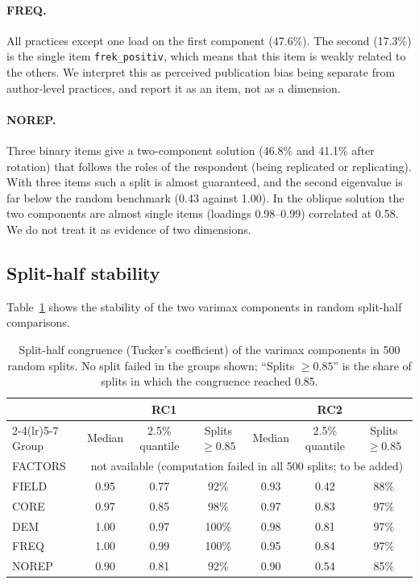 \documentclass[11pt,a4paper]{article}
\newcommand{\var}[1]{\texttt{#1}}
\begin{document}
\paragraph{FREQ.} All practices except one load on the first component (47.6\%). The second (17.3\%) is the single item \var{frek\_positiv}, which means that this item is weakly related to the others. We interpret this as perceived publication bias being separate from author-level practices, and report it as an item, not as a dimension.

\paragraph{NOREP.} Three binary items give a two-component solution (46.8\% and 41.1\% after rotation) that follows the roles of the respondent (being replicated or replicating). With three items such a split is almost guaranteed, and the second eigenvalue is far below the random benchmark (0.43 against 1.00). In the oblique solution the two components are almost single items (loadings 0.98--0.99) correlated at 0.58. We do not treat it as evidence of two dimensions.

\subsection{Split-half stability}

Table~\ref{tab:split} shows the stability of the two varimax components in random split-half comparisons.

\begin{table}[ht]
\centering
\small
\begin{tabular}{@{}l c c c c c c@{}}
\toprule
 & \multicolumn{3}{c}{RC1} & \multicolumn{3}{c}{RC2}\\
\cmidrule(lr){2-4}\cmidrule(lr){5-7}
Group & Median & 2.5\% quantile & Splits $\geq 0.85$ & Median & 2.5\% quantile & Splits $\geq 0.85$\\
\midrule
FACTORS & \multicolumn{6}{c}{not available (computation failed in all 500 splits; to be added)}\\
FIELD  & 0.95 & 0.77 & 92\% & 0.93 & 0.42 & 88\%\\
CORE   & 0.97 & 0.85 & 98\% & 0.97 & 0.83 & 97\%\\
DEM    & 1.00 & 0.97 & 100\% & 0.98 & 0.81 & 97\%\\
FREQ   & 1.00 & 0.99 & 100\% & 0.95 & 0.84 & 97\%\\
NOREP  & 0.90 & 0.81 & 92\% & 0.90 & 0.54 & 85\%\\
\bottomrule
\end{tabular}
\caption{Split-half congruence (Tucker's coefficient) of the varimax components in 500 random splits. No split failed in the groups shown; ``Splits $\geq 0.85$'' is the share of splits in which the congruence reached 0.85.}
\label{tab:split}
\end{table}
\end{document}
